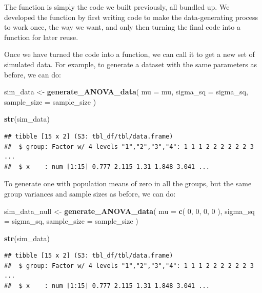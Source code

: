 \documentclass[
]{book}
\newenvironment{Shaded}{\begin{snugshade}}{\end{snugshade}}
\newcommand{\AttributeTok}[1]{\textcolor[rgb]{0.13,0.29,0.53}{#1}}
\newcommand{\DecValTok}[1]{\textcolor[rgb]{0.00,0.00,0.81}{#1}}
\newcommand{\FunctionTok}[1]{\textcolor[rgb]{0.13,0.29,0.53}{\textbf{#1}}}
\newcommand{\NormalTok}[1]{#1}
\newcommand{\OtherTok}[1]{\textcolor[rgb]{0.56,0.35,0.01}{#1}}
\begin{document}
The function is simply the code we built previously, all bundled up.
We developed the function by first writing code to make the data-generating process to work once, the way we want, and only then turning the final code into a function for later reuse.

Once we have turned the code into a function, we can call it to get a new set of simulated data.
For example, to generate a dataset with the same parameters as before, we can do:

\begin{Shaded}
\begin{Highlighting}[]
\NormalTok{sim\_data }\OtherTok{\textless{}{-}} \FunctionTok{generate\_ANOVA\_data}\NormalTok{(}
  \AttributeTok{mu =}\NormalTok{ mu, }
  \AttributeTok{sigma\_sq =}\NormalTok{ sigma\_sq,}
  \AttributeTok{sample\_size =}\NormalTok{ sample\_size}
\NormalTok{)}

\FunctionTok{str}\NormalTok{(sim\_data)}
\end{Highlighting}
\end{Shaded}

\begin{verbatim}
## tibble [15 x 2] (S3: tbl_df/tbl/data.frame)
##  $ group: Factor w/ 4 levels "1","2","3","4": 1 1 1 2 2 2 2 2 2 3 ...
##  $ x    : num [1:15] 0.777 2.115 1.31 1.848 3.041 ...
\end{verbatim}

To generate one with population means of zero in all the groups, but the same group variances and sample sizes as before, we can do:

\begin{Shaded}
\begin{Highlighting}[]
\NormalTok{sim\_data\_null }\OtherTok{\textless{}{-}} \FunctionTok{generate\_ANOVA\_data}\NormalTok{(}
  \AttributeTok{mu =} \FunctionTok{c}\NormalTok{( }\DecValTok{0}\NormalTok{, }\DecValTok{0}\NormalTok{, }\DecValTok{0}\NormalTok{, }\DecValTok{0}\NormalTok{ ),}
  \AttributeTok{sigma\_sq =}\NormalTok{ sigma\_sq, }
  \AttributeTok{sample\_size =}\NormalTok{ sample\_size}
\NormalTok{)}

\FunctionTok{str}\NormalTok{(sim\_data)}
\end{Highlighting}
\end{Shaded}

\begin{verbatim}
## tibble [15 x 2] (S3: tbl_df/tbl/data.frame)
##  $ group: Factor w/ 4 levels "1","2","3","4": 1 1 1 2 2 2 2 2 2 3 ...
##  $ x    : num [1:15] 0.777 2.115 1.31 1.848 3.041 ...
\end{verbatim}
\end{document}
